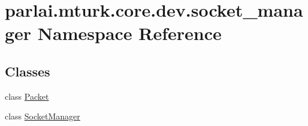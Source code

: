 \hypertarget{namespaceparlai_1_1mturk_1_1core_1_1dev_1_1socket__manager}{}\section{parlai.\+mturk.\+core.\+dev.\+socket\+\_\+manager Namespace Reference}
\label{namespaceparlai_1_1mturk_1_1core_1_1dev_1_1socket__manager}
\subsection*{Classes}
\begin{DoxyCompactItemize}
\item 
class \hyperlink{classparlai_1_1mturk_1_1core_1_1dev_1_1socket__manager_1_1Packet}{Packet}
\item 
class \hyperlink{classparlai_1_1mturk_1_1core_1_1dev_1_1socket__manager_1_1SocketManager}{Socket\+Manager}
\end{DoxyCompactItemize}
